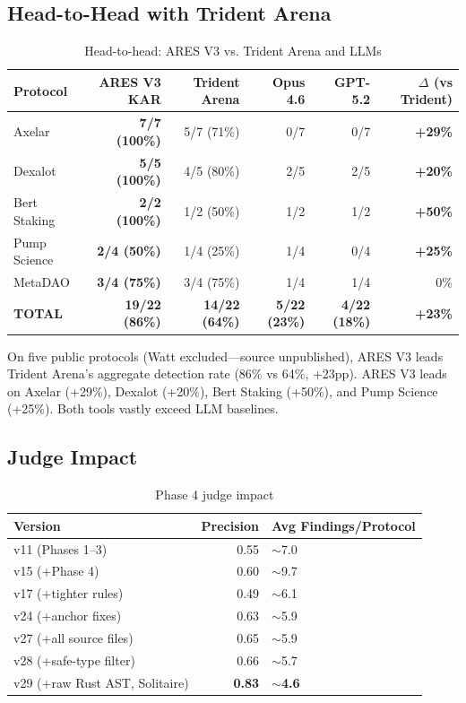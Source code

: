 \documentclass[conference]{IEEEtran}
\begin{document}
\subsection{Head-to-Head with Trident Arena}

\begin{table}[htbp]
  \caption{Head-to-head: ARES V3 vs. Trident Arena and LLMs}
  \label{tab:h2h}
  \centering
  \begin{tabular}{lrrrrr}
    \hline
    Protocol & ARES V3 KAR & Trident Arena & Opus 4.6 & GPT-5.2 & $\Delta$ (vs Trident) \\
    \hline
    Axelar & {\bf 7/7 (100\%)} & 5/7 (71\%) & 0/7 & 0/7 & {\bf +29\%} \\
    Dexalot & {\bf 5/5 (100\%)} & 4/5 (80\%) & 2/5 & 2/5 & {\bf +20\%} \\
    Bert Staking & {\bf 2/2 (100\%)} & 1/2 (50\%) & 1/2 & 1/2 & {\bf +50\%} \\
    Pump Science & {\bf 2/4 (50\%)} & 1/4 (25\%) & 1/4 & 0/4 & {\bf +25\%} \\
    MetaDAO & {\bf 3/4 (75\%)} & 3/4 (75\%) & 1/4 & 1/4 & 0\% \\
    \hline
    {\bf TOTAL} & {\bf 19/22 (86\%)} & {\bf 14/22 (64\%)} & {\bf 5/22 (23\%)} & {\bf 4/22 (18\%)} & {\bf +23\%} \\
    \hline
  \end{tabular}
\end{table}

On five public protocols (Watt excluded---source unpublished), ARES V3 leads Trident Arena'{}s aggregate detection rate (86\% vs 64\%, +23pp). ARES V3 leads on Axelar (+29\%), Dexalot (+20\%), Bert Staking (+50\%), and Pump Science (+25\%). Both tools vastly exceed LLM baselines.

\subsection{Judge Impact}

\begin{table}[htbp]
  \caption{Phase 4 judge impact}
  \label{tab:judge_impact}
  \centering
  \begin{tabular}{lrl}
    \hline
    Version & Precision & Avg Findings/Protocol \\
    \hline
    v11 (Phases 1--3) & 0.55 & $\sim$7.0 \\
    v15 (+Phase 4) & 0.60 & $\sim$9.7 \\
    v17 (+tighter rules) & 0.49 & $\sim$6.1 \\
    v24 (+anchor fixes) & 0.63 & $\sim$5.9 \\
    v27 (+all source files) & 0.65 & $\sim$5.9 \\
    v28 (+safe-type filter) & 0.66 & $\sim$5.7 \\
    v29 (+raw Rust AST, Solitaire) & {\bf 0.83} & $\sim${\bf 4.6} \\
    \hline
  \end{tabular}
\end{table}
\end{document}
